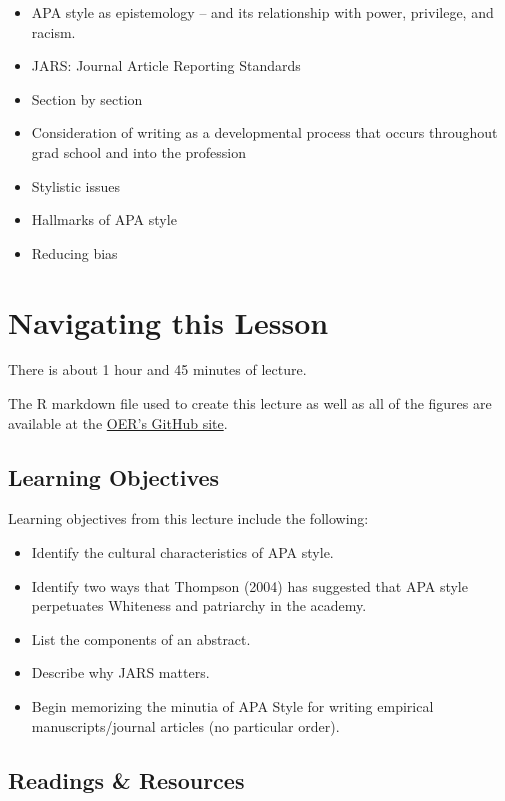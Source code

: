 \documentclass[
  english,
]{book}
\providecommand{\tightlist}{%
  \setlength{\itemsep}{0pt}\setlength{\parskip}{0pt}}
\begin{document}
\begin{itemize}
\tightlist
\item
  APA style as epistemology -- and its relationship with power, privilege, and racism.
\item
  JARS: Journal Article Reporting Standards
\item
  Section by section
\item
  Consideration of writing as a developmental process that occurs throughout grad school and into the profession
\item
  Stylistic issues
\item
  Hallmarks of APA style
\item
  Reducing bias
\end{itemize}

\hypertarget{navigating-this-lesson}{%
\section{Navigating this Lesson}\label{navigating-this-lesson}}

There is about 1 hour and 45 minutes of lecture.

The R markdown file used to create this lecture as well as all of the figures are available at the \href{https://github.com/lhbikos/ReC_Topics}{OER's GitHub site}.

\hypertarget{learning-objectives}{%
\subsection{Learning Objectives}\label{learning-objectives}}

Learning objectives from this lecture include the following:

\begin{itemize}
\tightlist
\item
  Identify the cultural characteristics of APA style.
\item
  Identify two ways that Thompson (2004) has suggested that APA style perpetuates Whiteness and patriarchy in the academy.
\item
  List the components of an abstract.
\item
  Describe why JARS matters.
\item
  Begin memorizing the minutia of APA Style for writing empirical manuscripts/journal articles (no particular order).
\end{itemize}

\hypertarget{readings-resources}{%
\subsection{Readings \& Resources}\label{readings-resources}}
\end{document}
